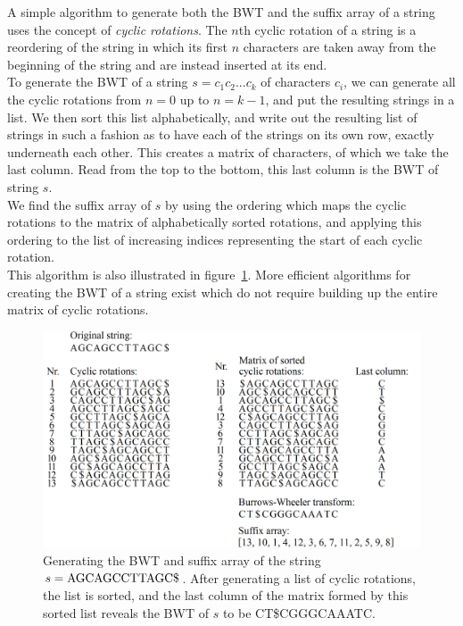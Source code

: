 \documentclass[a4paper,12pt,twoside,BCOR=10mm]{scrbook}
\begin{document}
A simple algorithm to generate both the BWT and the suffix array of a string uses
the concept of \textit{cyclic rotations}.
The $ n $th cyclic rotation of a string is a reordering of the string in which its first $ n $ characters
are taken away from the beginning of the string and are instead inserted at its end. \\
To generate the BWT of a string $ s = c_1 c_2 ... c_k $ of characters $ c_i $,
we can generate all the cyclic rotations from $ n = 0 $ up to $ n = k - 1 $, and
put the resulting strings in a list.
We then sort this list alphabetically, and write out the resulting list of strings
in such a fashion as to have each of the strings on its own row, exactly underneath each other.
This creates a matrix of characters, of which we take the last column.
Read from the top to the bottom, this last column is the BWT of string $ s $. \\
We find the suffix array of $ s $ by using the ordering which maps
the cyclic rotations to the matrix of alphabetically sorted rotations,
and applying this ordering to the list of increasing indices representing
the start of each cyclic rotation. \\
This algorithm is also illustrated in figure~\ref{fig:evo_fig_bwt_with_cyclic_rotations}.
More efficient algorithms for creating the BWT of a string exist
which do not require building up the entire matrix of cyclic rotations.

\begin{figure}[!htb]
\centering
\includegraphics[width=\textwidth]{evo_fig_bwt_with_cyclic_rotations.png}
\caption[Generating the BWT and suffix array of a string]{Generating the BWT and suffix array of the string $ s = \textup{AGCAGCCTTAGC\$} $. After generating a list of cyclic rotations, the list is sorted, and the last column of the matrix formed by this sorted list reveals the BWT of $ s $ to be \textup{CT\$CGGGCAAATC}.} \label{fig:evo_fig_bwt_with_cyclic_rotations}
\end{figure}
\end{document}
